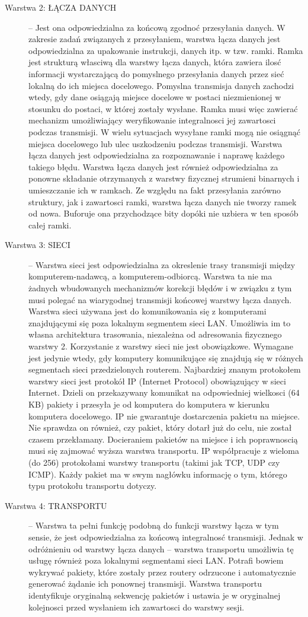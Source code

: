 \documentclass[a4paper,11pt]{article}
\begin{document}
\begin{description}
\item[Warstwa 2: ŁĄCZA DANYCH] --  Jest ona odpowiedzialna za końcową zgodnoć przesyłania danych. W zakresie zadań związanych z przesyłaniem, warstwa łącza danych jest odpowiedzialna za upakowanie instrukcji, danych itp. w tzw. ramki. Ramka jest strukturą własciwą dla warstwy łącza danych, która zawiera ilosć informacji wystarczającą do pomyslnego przesyłania danych przez sieć lokalną do ich miejsca docelowego. Pomyslna transmisja danych zachodzi wtedy, gdy dane osiągają miejsce docelowe w postaci niezmienionej w stosunku do postaci, w której zostały wysłane. Ramka musi więc zawierać mechanizm umożliwiający weryfikowanie integralnosci jej zawartosci podczas transmisji. W wielu sytuacjach wysyłane ramki mogą nie osiągnąć miejsca docelowego lub ulec uszkodzeniu podczas transmisji. Warstwa łącza danych jest odpowiedzialna za rozpoznawanie i naprawę każdego takiego błędu. Warstwa łącza danych jest również odpowiedzialna za ponowne składanie otrzymanych z warstwy fizycznej strumieni binarnych i umieszczanie ich w ramkach. Ze względu na fakt przesyłania zarówno struktury, jak i zawartosci ramki, warstwa łącza danych nie tworzy ramek od nowa. Buforuje ona przychodzące bity dopóki nie uzbiera w ten sposób całej ramki.
\item[Warstwa 3: SIECI] -- Warstwa sieci jest odpowiedzialna za okreslenie trasy transmisji między komputerem-nadawcą, a komputerem-odbiorcą. Warstwa ta nie ma żadnych wbudowanych mechanizmów korekcji błędów i w związku z tym musi polegać na wiarygodnej transmisji końcowej warstwy łącza danych. Warstwa sieci używana jest do komunikowania się z komputerami znajdującymi się poza lokalnym segmentem sieci LAN. Umożliwia im to własna architektura trasowania, niezależna od adresowania fizycznego warstwy 2. Korzystanie z warstwy sieci nie jest obowiązkowe. Wymagane jest jedynie wtedy, gdy komputery komunikujące się znajdują się w różnych segmentach sieci przedzielonych routerem. Najbardziej znanym protokołem warstwy sieci jest protokół IP (Internet Protocol) obowiązujący w sieci Internet. Dzieli on przekazywany komunikat na odpowiedniej wielkosci (64 KB) pakiety i przesyła je od komputera do komputera w kierunku komputera docelowego. IP nie gwarantuje dostarczenia pakietu na miejsce. Nie sprawdza on również, czy pakiet, który dotarł już do celu, nie został czasem przekłamany. Docieraniem pakietów na miejsce i ich poprawnoscią musi się zajmować wyższa warstwa transportu. IP współpracuje z wieloma (do 256) protokołami warstwy transportu (takimi jak TCP, UDP czy ICMP). Każdy pakiet ma w swym nagłówku informację o tym, którego typu protokołu transportu dotyczy. 
\item[Warstwa 4: TRANSPORTU] -- Warstwa ta pełni funkcję podobną do funkcji warstwy łącza w tym sensie, że jest odpowiedzialna za końcową integralnosć transmisji. Jednak w odróżnieniu od warstwy łącza danych -- warstwa transportu umożliwia tę usługę również poza lokalnymi segmentami sieci LAN. Potrafi bowiem wykrywać pakiety, które zostały przez routery odrzucone i automatycznie generować żądanie ich ponownej transmisji. Warstwa transportu identyfikuje oryginalną sekwencję pakietów i ustawia je w oryginalnej kolejnosci przed wysłaniem ich zawartosci do warstwy sesji.


\end{description}
\end{document}
